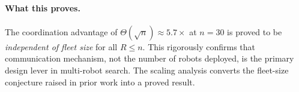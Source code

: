 \begin{doublespacing}
\paragraph{What this proves.}
The coordination advantage of $\Theta(\sqrt{n}) \approx 5.7\times$ at
$n = 30$ is proved to be \emph{independent of fleet size} for all
$R \leq n$. This rigorously confirms that communication mechanism,
not the number of robots deployed, is the primary design lever in
multi-robot search. The scaling analysis converts the fleet-size
conjecture raised in prior work into a proved result.

\end{doublespacing}
